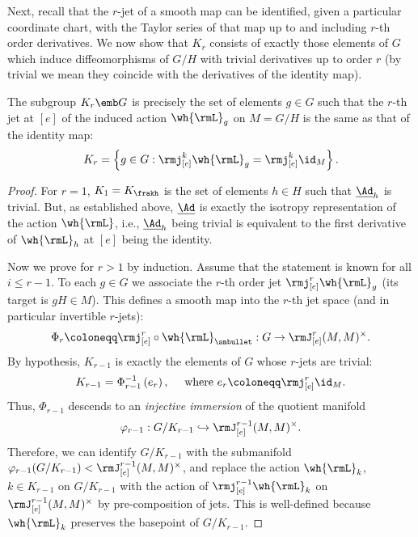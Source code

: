 Next, recall that the $r$-jet of a smooth map can be identified, given a particular coordinate chart, with the Taylor series of that map up to and including $r$-th order derivatives. We now show that $K_r$ consists of exactly those elements of $G$ which induce diffeomorphisms of $G\slash H$ with trivial derivatives up to order $r$ (by trivial we mean they coincide with the derivatives of the identity map).

\begin{lem}
    The subgroup $K_r\emb G$ is precisely the set of elements $g\in G$
    such that the $r$-th jet at $[e]$ of the induced action $\wh{\rmL}_g$ on $M=G\slash H$ is the same as that of the identity map:
    \[K_r=\left\{g\in G: \rmj^k_{[e]}\wh{\rmL}_g=\rmj^k_{[e]}\id_{M}\right\}.\]
\end{lem}
\begin{proof}
    For $r=1$, $K_1=K_{\frakh}$ is the set of elements $h\in H$ such that $\underline{\Ad}_h$ is trivial. But, as established above, $\underline{\Ad}$ is exactly the isotropy representation of the action $\wh{\rmL}$, i.e., $\underline{\Ad}_h$ being trivial is equivalent to the first derivative of $\wh{\rmL}_h$ at $[e]$ being the identity.

    Now we prove for $r>1$ by induction. Assume that the statement is known for all $i\leq r-1$. To each $g\in G$ we associate the $r$-th order jet $\rmj^r_{[e]}\wh{\rmL}_g$ (its target is $gH\in M$). This defines a smooth map into the $r$-th jet space (and in particular invertible $r$-jets):
    \[\Phi_r\coloneqq \rmj_{[e]}^r\circ \wh{\rmL}_{\smbullet}: G\to \rmJ^r_{[e]}(M,M)^\times.\]
    By hypothesis, $K_{r-1}$ is exactly the elements of $G$ whose $r$-jets are trivial:
    \[K_{r-1}=\Phi_{r-1}^{-1}\left(e_r\right), \quad \text{ where }e_r\coloneqq \rmj^r_{[e]}\id_M.\]
    Thus, $\Phi_{r-1}$ descends to an \emph{injective immersion} of the quotient manifold
    \[\varphi_{r-1}:G\slash K_{r-1}\hookrightarrow \rmJ^{r-1}_{[e]}(M,M)^\times.\]
    Therefore, we can identify $G\slash K_{r-1}$ with the submanifold $\varphi_{r-1}(G\slash K_{r-1})< \rmJ^{r-1}_{[e]}(M,M)^\times$, and replace the action $\wh{\rmL}_k$, $k\in K_{r-1}$ on $G\slash K_{r-1}$ with the action of $\rmj^{r-1}_{[e]}\wh{\rmL}_k$ on $\rmJ^{r-1}_{[e]}(M,M)^\times$ by pre-composition of jets. This is well-defined because $\wh{\rmL}_k$ preserves the basepoint of $G\slash K_{r-1}$.
    

\end{proof}
